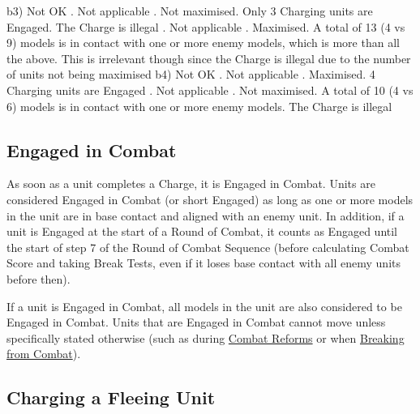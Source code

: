 \begin{figure*}[!htbp]
\begin{minipage}{0.47\textwidth}
{		b3) Not OK\captionlist
		. Not applicable\newline
		. Not maximised. Only 3 Charging units are Engaged. The Charge is illegal\newline
		. Not applicable\newline
		. Maximised. A total of 13 (4 vs 9) models is in contact with one or more enemy models, which is more than all the above. This is irrelevant though since the Charge is illegal due to the number of units not being maximised
		\vspace*{1cm}\captionpar
		b4) Not OK\captionlist
		. Not applicable\newline
		. Maximised. 4 Charging units are Engaged\newline
		. Not applicable\newline
		. Not maximised. A total of 10 (4 vs 6) models is in contact with one or more enemy models. The Charge is illegal
}
	\label{figure/combined_charges}
	\end{minipage}
\end{figure*}

\subsection{Engaged in Combat}
\label{engaged_in_combat}

As soon as a unit completes a Charge, it is Engaged in Combat. Units are considered Engaged in Combat (or short Engaged) as long as one or more models in the unit are in base contact and aligned with an enemy unit. In addition, if a unit is Engaged at the start of a Round of Combat, it counts as Engaged until the start of step 7 of the Round of Combat Sequence (before calculating Combat Score and taking Break Tests, even if it loses base contact with all enemy units before then).

If a unit is Engaged in Combat, all models in the unit are also considered to be Engaged in Combat. Units that are Engaged in Combat cannot move unless specifically stated otherwise (such as during \hyperref[combat_reform]{Combat Reforms} or when \hyperref[break_test]{Breaking from Combat}).

\subsection{Charging a Fleeing Unit}
\label{charging_a_fleeing_unit}

